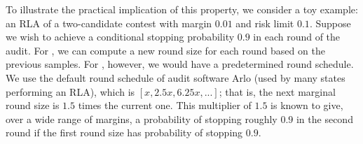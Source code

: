 



%
To illustrate the practical implication of this property, we consider a toy example: an RLA of a two-candidate contest with margin $0.01$ and risk limit $0.1$. 
Suppose we wish to achieve a conditional stopping probability $0.9$ in each round of the audit. For \Providence, we can compute a new round size for each round based on the previous samples. For \Minerva, however, we would have a predetermined round schedule. We use the default \Minerva round schedule of audit software Arlo \cite{arlo} (used by many states performing an RLA), which is $[x, 2.5x, 6.25x, ...]$; that is, the next marginal round size is $1.5$ times the current one. This multiplier of $1.5$ is known to give, over a wide range of margins, a probability of stopping roughly $0.9$ in the second round if the first round size has probability of stopping $0.9$. 

